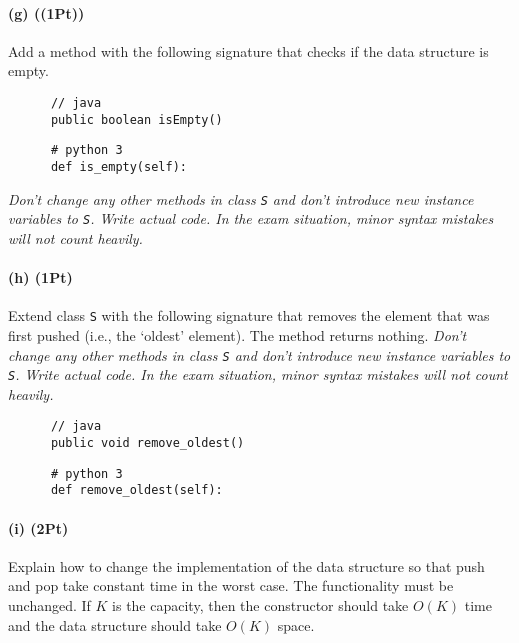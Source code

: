\documentclass{tufte-handout}
\begin{document}
      \paragraph*{(g) ((1Pt))}
     Add a method with the following signature that checks if the data structure is empty.

      \begin{minipage}{6cm}
      \begin{verbatim}
      // java
      public boolean isEmpty()
      \end{verbatim}
      \end{minipage}
%
      \begin{minipage}{6cm}
      \begin{verbatim}
      # python 3
      def is_empty(self):
      \end{verbatim}
      \end{minipage}

      \emph{Don't change any other methods in class {\tt S} and don't introduce new instance variables to {\tt S}.
        Write actual code.
        In the exam situation, minor syntax mistakes will not count heavily.}
     
      \paragraph*{(h) (1Pt)}
      Extend class {\tt S} with the following signature that removes the element that was first pushed (i.e., the `oldest' element).
      The method returns nothing.
      \emph{Don't change any other methods in class {\tt S} and don't introduce new instance variables to {\tt S}.
        Write actual code.
        In the exam situation, minor syntax mistakes will not count heavily.}

    \medskip
      \begin{minipage}{6cm}
      \begin{verbatim}
      // java
      public void remove_oldest()
      \end{verbatim}
      \end{minipage}
%
      \begin{minipage}{6cm}
      \begin{verbatim}
      # python 3
      def remove_oldest(self):
      \end{verbatim}
      \end{minipage}

      \paragraph*{(i) (2Pt)}
      Explain how to change the implementation of the data structure so that push and pop take constant time in the worst case.
      The functionality must be unchanged.
      If $K$ is the capacity, then the constructor should take $O(K)$ time and the data structure should take $O(K)$ space.
\end{document}
